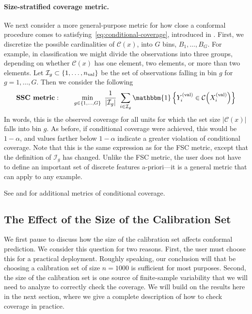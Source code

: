 \documentclass[10pt]{article}
\def\Ical{\mathcal{I}}
\newcommand{\C}{\mathcal{C}}
\newcommand{\ind}[1]{\mathbbm{1}\left\{#1\right\}}
\begin{document}
\paragraph{Size-stratified coverage metric.} We next consider a more general-purpose metric for how close a conformal procedure comes to satisfying~\eqref{eq:conditional-coverage}, introduced in \citep{angelopoulos2020sets}. First, we discretize the possible cardinalities of $\C(x)$, into $G$ bins, $B_1,\dots,B_G$. For example, in classification we might divide the observations into three groups, depending on whether $\C(x)$ has one element, two elements, or more than two elements. Let $\Ical_g \subset \{1,\dots,n_{\rm val}\}$ be the set of observations falling in bin $g$ for $g = 1,\dots,G$. Then we consider the following 
\begin{equation*}
    \textbf{SSC metric}: \qquad \min_{g \in \{1,\dots,G\}} \  \frac{1}{|\Ical_g|} \ \sum_{i\in\Ical_g} \ind{Y_i^{\rm (val)} \in \C\Big(X_i^{\rm (val)}\Big)}
\end{equation*}
In words, this is the observed coverage for all units for which the set size $|\C(x)|$ falls into bin $g$. As before, if conditional coverage were achieved, this would be $1-\alpha$, and values farther below $1-\alpha$ indicate a greater violation of conditional coverage. Note that this is the same expression as for the FSC metric, except that the definition of $\Ical_g$ has changed.
Unlike the FSC metric, the user does not have to define an important set of discrete features a-priori---it is a general metric that can apply to any example.

See \cite{cauchois2020knowing} and \cite{feldman2021improving} for additional metrics of conditional coverage.

\subsection{The Effect of the Size of the Calibration Set}
\label{subsec:cal_size}
We first pause to discuss how the size of the calibration set affects conformal prediction. 
We consider this question for two reasons. 
First, the user must choose this for a practical deployment. Roughly speaking, our conclusion will that be choosing a calibration set of size $n=1000$ is sufficient for most purposes.
Second, the size of the calibration set is one source of finite-sample variability that we will need to analyze to correctly check the coverage. 
We will build on the results here in the next section, where we give a complete description of how to check coverage in practice. 
\end{document}
